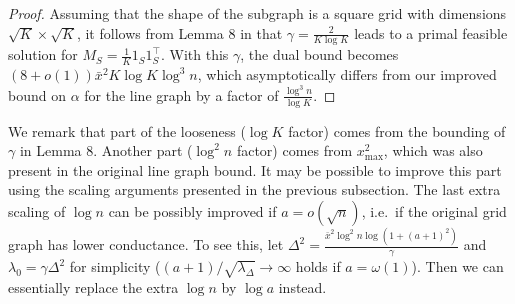 \documentclass{article}
\begin{document}
\begin{proof}
  Assuming that the shape of the subgraph is a square grid with dimensions $\sqrt{K} \times \sqrt{K}$, it follows from Lemma 8 in \cite{nips_supp} that $\gamma = \frac{2}{K \log K}$ leads to a primal feasible solution for $M_S = \frac{1}{K} 1_S 1_S^\top$. With this $\gamma$, the dual bound becomes $(8 + o(1)) \bar{x}^2 K \log K \log^3 n$, which asymptotically differs from our improved bound on $\alpha$ for the line graph by a factor of $\frac{\log^3 n}{\log K}$.
\end{proof}

We remark that part of the looseness ($\log K$ factor) comes from the bounding of $\gamma$ in Lemma 8. Another part ($\log^2 n$ factor) comes from $x_{\max}^2$, which was also present in the original line graph bound. It may be possible to improve this part using the scaling arguments presented in the previous subsection. The last extra scaling of $\log n$ can be possibly improved if $a = o(\sqrt{n})$, i.e.\ if the original grid graph has lower conductance. To see this, let $\Delta^2 = \frac{\bar{x}^2 \log^2 n \log(1 + (a+1)^2)}{\gamma}$ and $\lambda_0 = \gamma \Delta^2$ for simplicity ($(a+1)/\sqrt{\lambda_\Delta} \to \infty$ holds if $a = \omega(1)$). Then we can essentially replace the extra $\log n$ by $\log a$ instead.
\end{document}
